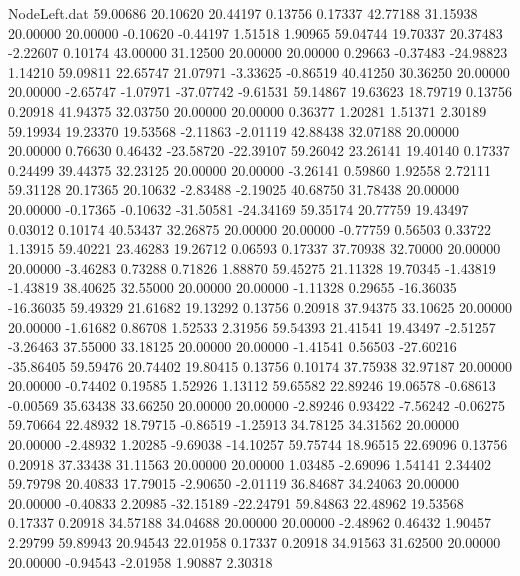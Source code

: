 \begin{filecontents}{NodeLeft.dat}
  59.00686   20.10620   20.44197     0.13756    0.17337   42.77188   31.15938   20.00000   20.00000   -0.10620   -0.44197    1.51518    1.90965
  59.04744   19.70337   20.37483    -2.22607    0.10174   43.00000   31.12500   20.00000   20.00000    0.29663   -0.37483  -24.98823    1.14210
  59.09811   22.65747   21.07971    -3.33625   -0.86519   40.41250   30.36250   20.00000   20.00000   -2.65747   -1.07971  -37.07742   -9.61531
  59.14867   19.63623   18.79719     0.13756    0.20918   41.94375   32.03750   20.00000   20.00000    0.36377    1.20281    1.51371    2.30189
  59.19934   19.23370   19.53568    -2.11863   -2.01119   42.88438   32.07188   20.00000   20.00000    0.76630    0.46432  -23.58720  -22.39107
  59.26042   23.26141   19.40140     0.17337    0.24499   39.44375   32.23125   20.00000   20.00000   -3.26141    0.59860    1.92558    2.72111
  59.31128   20.17365   20.10632    -2.83488   -2.19025   40.68750   31.78438   20.00000   20.00000   -0.17365   -0.10632  -31.50581  -24.34169
  59.35174   20.77759   19.43497     0.03012    0.10174   40.53437   32.26875   20.00000   20.00000   -0.77759    0.56503    0.33722    1.13915
  59.40221   23.46283   19.26712     0.06593    0.17337   37.70938   32.70000   20.00000   20.00000   -3.46283    0.73288    0.71826    1.88870
  59.45275   21.11328   19.70345    -1.43819   -1.43819   38.40625   32.55000   20.00000   20.00000   -1.11328    0.29655  -16.36035  -16.36035
  59.49329   21.61682   19.13292     0.13756    0.20918   37.94375   33.10625   20.00000   20.00000   -1.61682    0.86708    1.52533    2.31956
  59.54393   21.41541   19.43497    -2.51257   -3.26463   37.55000   33.18125   20.00000   20.00000   -1.41541    0.56503  -27.60216  -35.86405
  59.59476   20.74402   19.80415     0.13756    0.10174   37.75938   32.97187   20.00000   20.00000   -0.74402    0.19585    1.52926    1.13112
  59.65582   22.89246   19.06578    -0.68613   -0.00569   35.63438   33.66250   20.00000   20.00000   -2.89246    0.93422   -7.56242   -0.06275
  59.70664   22.48932   18.79715    -0.86519   -1.25913   34.78125   34.31562   20.00000   20.00000   -2.48932    1.20285   -9.69038  -14.10257
  59.75744   18.96515   22.69096     0.13756    0.20918   37.33438   31.11563   20.00000   20.00000    1.03485   -2.69096    1.54141    2.34402
  59.79798   20.40833   17.79015    -2.90650   -2.01119   36.84687   34.24063   20.00000   20.00000   -0.40833    2.20985  -32.15189  -22.24791
  59.84863   22.48962   19.53568     0.17337    0.20918   34.57188   34.04688   20.00000   20.00000   -2.48962    0.46432    1.90457    2.29799
  59.89943   20.94543   22.01958     0.17337    0.20918   34.91563   31.62500   20.00000   20.00000   -0.94543   -2.01958    1.90887    2.30318

\end{filecontents}
